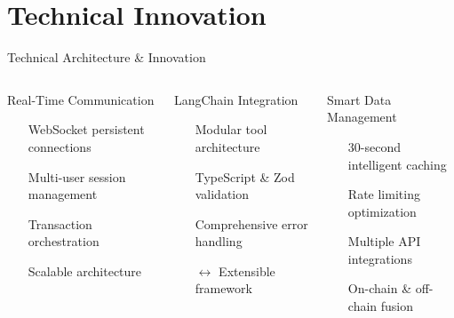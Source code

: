 \documentclass[aspectratio=169]{beamer}
\providecommand{\faExchangeAlt}{\faSync}
\providecommand{\faExpandArrowsAlt}{\ensuremath{\leftrightarrow}}
\providecommand{\faShieldAlt}{\faLock}
\providecommand{\faUsersCog}{\faUsers}
\providecommand{\faNetworkWired}{\faCogs}
\providecommand{\faLayerGroup}{\faCogs}
\begin{document}
\section{Technical Innovation}

\begin{frame}{Technical Architecture \& Innovation}
\vspace{0.05cm}
\begin{columns}
\begin{block}{Real-Time Communication \hfill
{}}
\begin{itemize}
\item[\color{accent}\faPlug] WebSocket persistent connections
\item[\color{accent}\faUsersCog] Multi-user session management
\item[\color{accent}\faExchangeAlt] Transaction orchestration
\item[\color{accent}\faNetworkWired] Scalable architecture
\end{itemize}
\end{block}

\begin{block}{LangChain Integration \hfill
{}}
\begin{itemize}
\item[\color{secondary}\faCogs] Modular tool architecture
\item[\color{secondary}\faShieldAlt] TypeScript \& Zod validation
\item[\color{secondary}\faExclamationCircle] Comprehensive error handling
\item[\color{secondary}\faExpandArrowsAlt] Extensible framework
\end{itemize}
\end{block}

\begin{block}{Smart Data Management \hfill
{}}
\begin{itemize}
\item[\color{success}\faStopwatch] 30-second intelligent caching
\item[\color{success}\faChartLine] Rate limiting optimization
\item[\color{success}\faLayerGroup] Multiple API integrations
\item[\color{success}\faLink] On-chain \& off-chain fusion
\end{itemize}
\end{block}


\end{columns}
\end{frame}
\end{document}
